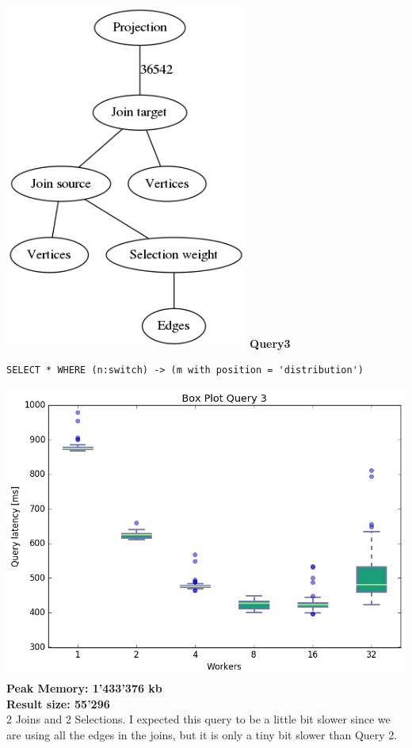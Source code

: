\documentclass[11pt,singlecolumn]{scrartcl}
\begin{document}
\includegraphics[width=0.6\textwidth]{graph2}
\clearpage
\textbf{Query3}\\
\begin{verbatim}
SELECT * WHERE (n:switch) -> (m with position = 'distribution')\end{verbatim}
\includegraphics[width=1\textwidth]{box/q3}
\textbf{Peak Memory: 1'433'376 kb}\\
\textbf{Result size: 55'296}\\
2 Joins and 2 Selections. I expected this query to be a little bit slower since we are using all the edges in the joins, but it is only a tiny bit slower than Query 2.
\clearpage
\end{document}

